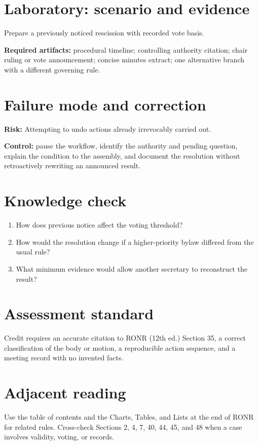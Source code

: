 \documentclass[11pt]{article}
\begin{document}
\section{Laboratory: scenario and evidence}
Prepare a previously noticed rescission with recorded vote basis.

\textbf{Required artifacts:} procedural timeline; controlling authority citation; chair ruling or vote announcement; concise minutes extract; one alternative branch with a different governing rule.

\section{Failure mode and correction}
\textbf{Risk:} Attempting to undo actions already irrevocably carried out.

\textbf{Control:} pause the workflow, identify the authority and pending question, explain the condition to the assembly, and document the resolution without retroactively rewriting an announced result.

\section{Knowledge check}
\begin{enumerate}[leftmargin=*,itemsep=4pt]
\item How does previous notice affect the voting threshold?
\item How would the resolution change if a higher-priority bylaw differed from the usual rule?
\item What minimum evidence would allow another secretary to reconstruct the result?
\end{enumerate}

\section{Assessment standard}
Credit requires an accurate citation to RONR (12th ed.) Section 35, a correct classification of the body or motion, a reproducible action sequence, and a meeting record with no invented facts.

\section{Adjacent reading}
Use the table of contents and the Charts, Tables, and Lists at the end of RONR for related rules. Cross-check Sections 2, 4, 7, 40, 44, 45, and 48 when a case involves validity, voting, or records.
\end{document}
